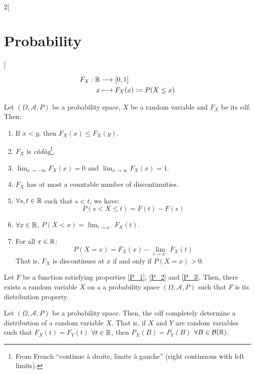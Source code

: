\documentclass[../../../main.tex]{subfiles}
\begin{document}
\begin{multicols}{2}[\section{Probability}]
\begin{definition}
\begin{align*}
      F_X:\mathbb{R} & \longrightarrow [0,1]          \\
      x       & \longmapsto F_X(x):=P(X\leq x)
    \end{align*}
  \end{definition}
  \begin{prop}
    Let $(\Omega,\mathcal{A},P)$ be a probability space, $X$ be a random variable and $F_X$ be its cdf. Then:
    \begin{enumerate}
      \item\label{P_1} If $x<y$, then $F_X(x)\leq F_X(y)$.
      \item\label{P_2} $F_X$ is \textit{càdàg}\footnote{From French ``continue à droite, limite à gauche'' (right continuous with left limits).}.
      \item\label{P_3} $\displaystyle\lim_{x\to -\infty}F_X(x)=0$ and $\displaystyle\lim_{x\to \infty}F_X(x)=1$.
      \item $F_X$ has at most a countable number of discontinuities.
      \item $\forall s,t\in\mathbb{R}$ such that $s<t$, we have: $$P(s<X\leq t)=F(t)-F(s)$$
      \item $\displaystyle\forall x\in\mathbb{R}$, $\displaystyle P(X<x)=\lim_{t\to x^-}F_X(t)$.
      \item For all $x\in\mathbb{R}$: $$P(X=x)=F_X(x)-\lim_{t\to x^-}F_X(t)$$ That is, $F_X$ is discontinues at $x$ if and only if $P(X=x)>0$.
    \end{enumerate}
  \end{prop}
  \begin{theorem}
    Let $F$ be a function satisfying properties \ref{P_1}, \ref{P_2} and \ref{P_3}. Then, there exists a random variable $X$ on a a probability space $(\Omega,\mathcal{A},P)$ such that $F$ is its distribution property.
  \end{theorem}
  \begin{theorem}
    Let $(\Omega,\mathcal{A},P)$ be a probability space. Then, the cdf completely determine a distribution of a random variable $X$. That is, if $X$ and $Y$ are random variables such that $F_X(t)=F_Y(t)$ $\forall t\in\mathbb{R}$, then $P_X(B)=P_Y(B)$ $\forall B\in\mathcal{B}(\mathbb{R})$.
  \end{theorem}

\end{multicols}
\end{document}
